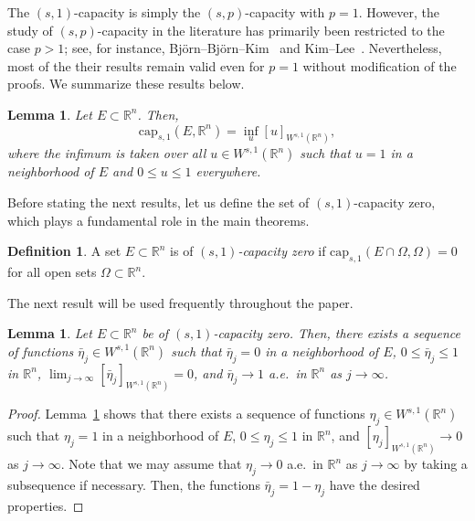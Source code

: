 \documentclass{amsart}
\theoremstyle{plain}
\newtheorem{lemma}[theorem]{Lemma}
\theoremstyle{definition}
\newtheorem{definition}[theorem]{Definition}
\numberwithin{equation}{section}
\begin{document}
The $(s, 1)$-capacity is simply the $(s, p)$-capacity with $p=1$. However, the study of $(s, p)$-capacity in the literature has primarily been restricted to the case $p>1$; see, for instance, Bj\"orn--Bj\"orn--Kim~\cite[Section~5]{BBK24} and Kim--Lee~\cite[Section~2.3]{KL24}. Nevertheless, most of the their results remain valid even for $p=1$ without modification of the proofs. We summarize these results below.

\begin{lemma}\label{lem-cap}\cite[Lemma~2.17]{KL24}
Let $E \subset \mathbb{R}^n$. Then,
\begin{equation*}
\mathrm{cap}_{s, 1}(E, \mathbb{R}^n) = \inf_{u} {[u]_{W^{s, 1}(\mathbb{R}^n)}},
\end{equation*}
where the infimum is taken over all $u \in W^{s, 1}(\mathbb{R}^n)$ such that $u=1$ in a neighborhood of $E$ and $0 \leq u \leq 1$ everywhere.
\end{lemma}

Before stating the next results, let us define the set of $(s, 1)$-capacity zero, which plays a fundamental role in the main theorems.

\begin{definition}
A set $E \subset \mathbb{R}^n$ is of \emph{$(s, 1)$-capacity zero} if $\mathrm{cap}_{s, 1}(E \cap \Omega, \Omega)=0$ for all open sets $\Omega \subset \mathbb{R}^n$.
\end{definition}

The next result will be used frequently throughout the paper.

\begin{lemma}\label{lem-cap-zero}
Let $E \subset \mathbb{R}^n$ be of $(s, 1)$-capacity zero. Then, there exists a sequence of functions $\bar{\eta}_j \in W^{s, 1}(\mathbb{R}^n)$ such that $\bar{\eta}_j=0$ in a neighborhood of $E$, $0 \leq \bar{\eta}_j \leq 1$ in $\mathbb{R}^n$, $\lim_{j\to \infty} [\bar{\eta}_j]_{W^{s, 1}(\mathbb{R}^n)} = 0$, and $\bar{\eta}_j \to 1$ a.e.\ in $\mathbb{R}^n$ as $j \to \infty$.
\end{lemma}

\begin{proof}
Lemma~\ref{lem-cap} shows that there exists a sequence of functions $\eta_j \in W^{s, 1}(\mathbb{R}^n)$ such that $\eta_j=1$ in a neighborhood of $E$, $0 \leq \eta_j \leq 1$ in $\mathbb{R}^n$, and $[\eta_j]_{W^{s, 1}(\mathbb{R}^n)} \to 0$ as $j \to \infty$. Note that we may assume that $\eta_j \to 0$ a.e.\ in $\mathbb{R}^n$ as $j \to \infty$ by taking a subsequence if necessary. Then, the functions $\bar{\eta}_j=1-\eta_j$ have the desired properties.
\end{proof}
\end{document}
